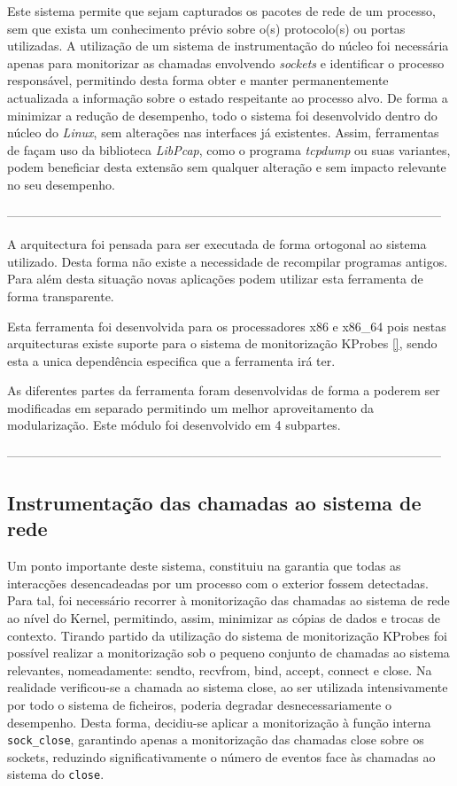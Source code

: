 Este sistema permite que sejam capturados os pacotes de rede de um processo, sem que exista um conhecimento prévio sobre o(s) protocolo(s) ou portas utilizadas. A utilização de um sistema de instrumentação do núcleo foi necessária apenas para monitorizar as chamadas envolvendo \emph{sockets} e identificar o processo responsável, permitindo desta forma obter e manter permanentemente actualizada a informação sobre o estado respeitante ao processo alvo. De forma a minimizar a redução de desempenho, todo o sistema foi desenvolvido dentro do núcleo do \textit{Linux}, sem alterações nas interfaces já existentes.  Assim, ferramentas de façam uso da biblioteca \textit{LibPcap}, como o programa \textit{tcpdump} ou suas variantes, podem beneficiar desta extensão sem qualquer alteração e sem impacto relevante no seu desempenho.

---------------------------------------------------------------------------------------------------------

A arquitectura foi pensada para ser executada de forma ortogonal ao sistema
utilizado. Desta forma não existe a necessidade de recompilar programas
antigos. Para além desta situação novas aplicações podem utilizar esta
ferramenta de forma transparente.

Esta ferramenta foi desenvolvida para os processadores x86 e x86\_64 pois nestas
arquitecturas existe suporte para o sistema de monitorização KProbes \ref{},
sendo esta a unica dependência especifica que a ferramenta irá ter.

As diferentes partes da ferramenta foram desenvolvidas de forma a poderem ser
modificadas em separado permitindo um melhor aproveitamento da modularização.
Este módulo foi desenvolvido em 4 subpartes. 

---------------------------------------------------------------------------------------------------------


\subsection*{Instrumentação das chamadas ao sistema de rede}
\label{sub:mon_syscalls}

Um ponto importante deste sistema, constituiu na garantia que todas as interacções desencadeadas por um processo com o exterior fossem detectadas. Para tal, foi necessário recorrer à monitorização das chamadas ao sistema de rede ao nível do Kernel, permitindo, assim, minimizar as cópias de dados e trocas de contexto. Tirando partido da utilização do sistema de monitorização KProbes foi possível realizar a monitorização sob o pequeno conjunto de chamadas ao sistema relevantes, nomeadamente: sendto, recvfrom, bind, accept, connect e close.
 Na realidade verificou-se a chamada ao sistema close, ao ser utilizada intensivamente por todo o sistema de ficheiros, poderia degradar desnecessariamente o desempenho. Desta forma, decidiu-se aplicar a monitorização à função interna \texttt{sock\_close}, garantindo apenas a monitorização das chamadas close sobre os sockets, reduzindo significativamente o número de eventos face às chamadas ao sistema do \texttt{close}.

